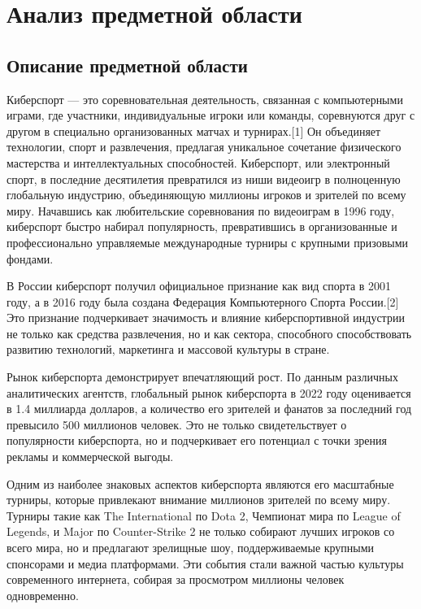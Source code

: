 \newsection
\section{Анализ предметной области}
\subsection{Описание предметной области}

Киберспорт — это соревновательная деятельность, связанная с компьютерными играми, где участники, индивидуальные игроки или команды, соревнуются друг с другом в специально организованных матчах и турнирах.[1] Он объединяет технологии, спорт и развлечения, предлагая уникальное сочетание физического мастерства и интеллектуальных способностей. Киберспорт, или электронный спорт, в последние десятилетия превратился из ниши видеоигр в полноценную глобальную индустрию, объединяющую миллионы игроков и зрителей по всему миру. Начавшись как любительские соревнования по видеоиграм в 1996 году, киберспорт быстро набирал популярность, превратившись в организованные и профессионально управляемые международные турниры с крупными призовыми фондами.

В России киберспорт получил официальное признание как вид спорта в 2001 году, а в 2016 году была создана Федерация Компьютерного Спорта России.[2] Это признание подчеркивает значимость и влияние киберспортивной индустрии не только как средства развлечения, но и как сектора, способного способствовать развитию технологий, маркетинга и массовой культуры в стране.

Рынок киберспорта демонстрирует впечатляющий рост. По данным различных аналитических агентств, глобальный рынок киберспорта в 2022 году оценивается в 1.4 миллиарда долларов, а количество его зрителей и фанатов за последний год превысило 500 миллионов человек. Это не только свидетельствует о популярности киберспорта, но и подчеркивает его потенциал с точки зрения рекламы и коммерческой выгоды.

Одним из наиболее знаковых аспектов киберспорта являются его масштабные турниры, которые привлекают внимание миллионов зрителей по всему миру. Турниры такие как The International по Dota 2, Чемпионат мира по League of Legends, и Major по Counter-Strike 2 не только собирают лучших игроков со всего мира, но и предлагают зрелищные шоу, поддерживаемые крупными спонсорами и медиа платформами. Эти события стали важной частью культуры современного интернета, собирая за просмотром миллионы человек одновременно.

